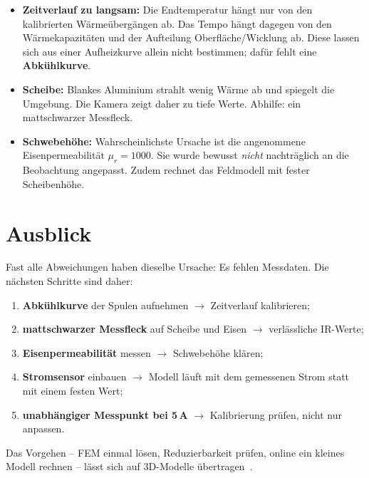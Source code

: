 \documentclass[a4paper, 10pt, conference]{ieeeconf}
\begin{document}
\begin{itemize}[leftmargin=*]
  \item \textbf{Zeitverlauf zu langsam:} Die Endtemperatur hängt nur von den
        kalibrierten Wärmeübergängen ab. Das Tempo hängt dagegen von den
        Wärmekapazitäten und der Aufteilung Oberfläche/Wicklung ab. Diese
        lassen sich aus einer Aufheizkurve allein nicht bestimmen; dafür
        fehlt eine \textbf{Abkühlkurve}.
  \item \textbf{Scheibe:} Blankes Aluminium strahlt wenig Wärme ab und
        spiegelt die Umgebung. Die Kamera zeigt daher zu tiefe Werte.
        Abhilfe: ein mattschwarzer Messfleck.
  \item \textbf{Schwebehöhe:} Wahrscheinlichste Ursache ist die angenommene
        Eisenpermeabilität $\mu_r = 1000$. Sie wurde bewusst \textit{nicht}
        nachträglich an die Beobachtung angepasst. Zudem rechnet das
        Feldmodell mit fester Scheibenhöhe.
\end{itemize}

\section{Ausblick}
\label{sec:outlook}

Fast alle Abweichungen haben dieselbe Ursache: Es fehlen Messdaten. Die
nächsten Schritte sind daher:
\begin{enumerate}[leftmargin=*]
  \item \textbf{Abkühlkurve} der Spulen aufnehmen $\rightarrow$ Zeitverlauf
        kalibrieren;
  \item \textbf{mattschwarzer Messfleck} auf Scheibe und Eisen
        $\rightarrow$ verlässliche IR-Werte;
  \item \textbf{Eisenpermeabilität} messen $\rightarrow$ Schwebehöhe klären;
  \item \textbf{Stromsensor} einbauen $\rightarrow$ Modell läuft mit dem
        gemessenen Strom statt mit einem festen Wert;
  \item \textbf{unabhängiger Messpunkt bei 5\,A} $\rightarrow$ Kalibrierung
        prüfen, nicht nur anpassen.
\end{enumerate}
Das Vorgehen -- FEM einmal lösen, Reduzierbarkeit prüfen, online ein kleines
Modell rechnen -- lässt sich auf 3D-Modelle
übertragen~\cite{hartmann2025golden,hartmann2018mor}.

\useRomanappendicesfalse
\appendices
\end{document}
